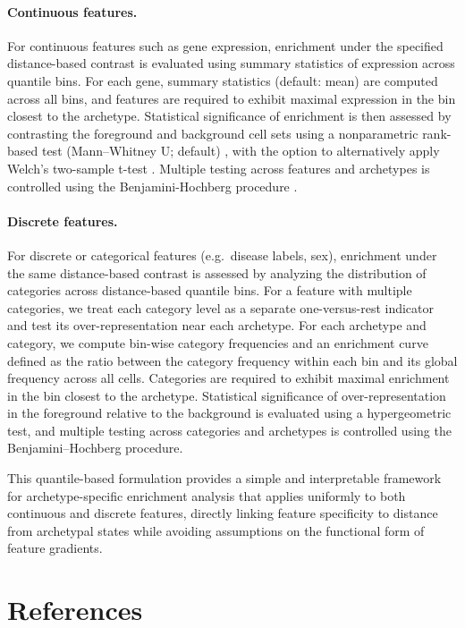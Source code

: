\documentclass[oneside]{article}
\begin{document}
\paragraph{Continuous features.}
For continuous features such as gene expression, enrichment under the specified distance-based contrast is evaluated using summary statistics of expression across quantile bins. For each gene, summary statistics (default: mean) are computed across all bins, and features are required to exhibit maximal expression in the bin closest to the archetype. Statistical significance of enrichment is then assessed by contrasting the foreground and background cell sets using a nonparametric rank-based test (Mann--Whitney U; default) \autocite{mannTestWhetherOne1947}, with the option to alternatively apply Welch's two-sample t-test \autocite{welchGeneralizationStudentsProblem1947}. Multiple testing across features and archetypes is controlled using the Benjamini-Hochberg procedure \autocite{10.1111/j.2517-6161.1995.tb02031.x}.

\paragraph{Discrete features.}
For discrete or categorical features (e.g.\ disease labels, sex), enrichment under the same distance-based contrast is assessed by analyzing the distribution of categories across distance-based quantile bins. For a feature with multiple categories, we treat each category level as a separate one-versus-rest indicator and test its over-representation near each archetype. For each archetype and category, we compute bin-wise category frequencies and an enrichment curve defined as the ratio between the category frequency within each bin and its global frequency across all cells. Categories are required to exhibit maximal enrichment in the bin closest to the archetype. Statistical significance of over-representation in the foreground relative to the background is evaluated using a hypergeometric test, and multiple testing across categories and archetypes is controlled using the Benjamini--Hochberg procedure.

This quantile-based formulation provides a simple and interpretable framework for archetype-specific enrichment analysis that applies uniformly to both continuous and discrete features, directly linking feature specificity to distance from archetypal states while avoiding assumptions on the functional form of feature gradients.

\clearpage
\section{References}
\end{document}
